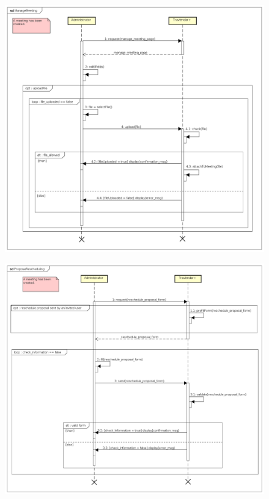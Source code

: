 \begin{figure}[!h]
\centering\includegraphics[width=\textwidth]{Images/SequenceDiagrams/Admin/ManageMeeting.png}{}
\caption{}
\end{figure}

\begin{figure}[!h]
\centering\includegraphics[width=\textwidth]{Images/SequenceDiagrams/Admin/ProposeRescheduling.png}{}
\caption{}
\end{figure}